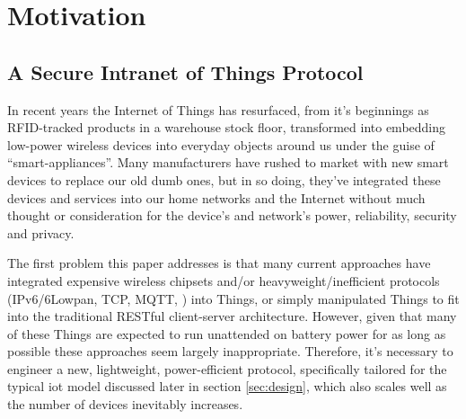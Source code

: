 \documentclass[conference]{./sty/IEEEtran}
\begin{document}

\section{Motivation} %
\label{sec:motivation}
\subsection{A Secure Intranet of Things Protocol} %
\label{sub:intranet_of_things_protocol}
In recent years the Internet of Things has resurfaced, from it's beginnings as RFID-tracked products in a warehouse stock floor, transformed into embedding low-power wireless devices into everyday objects around us under the guise of ``smart-appliances''. Many manufacturers have rushed to market with new smart devices to replace our old dumb ones, but in so doing, they've integrated these devices and services into our home networks and the Internet without much thought or consideration for the device's and network's power, reliability, security and privacy. 

The first problem this paper addresses is that many current approaches have integrated expensive wireless chipsets and/or heavyweight/inefficient protocols (IPv6/6Lowpan, TCP, MQTT\cite{MQTT}, \cite{xAP}) into Things, or simply manipulated Things to fit into the traditional RESTful client-server architecture\cite{IETF_COAP_HTTP}. However, given that many of these Things are expected to run unattended on battery power for as long as possible these approaches seem largely inappropriate. Therefore, it's necessary to engineer a new, lightweight, power-efficient protocol, specifically tailored for the typical iot model discussed later in section \ref{sec:design}, which also scales well as the number of devices inevitably increases. 
\end{document}
